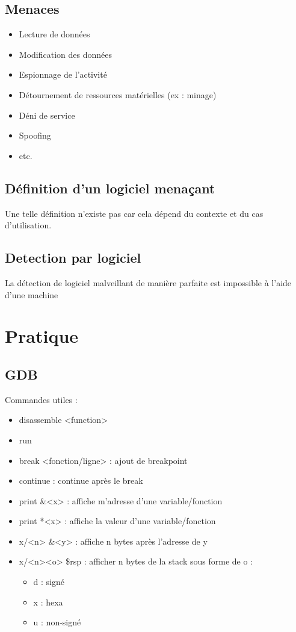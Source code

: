 \documentclass[a4paper]{article}
\begin{document}
\subsection{Menaces}
\begin{itemize}[label = \textbullet, font = \Large]
    \item Lecture de données
    \item Modification des données
    \item Espionnage de l'activité
    \item Détournement de ressources matérielles (ex : minage)
    \item Déni de service
    \item Spoofing
    \item etc.
\end{itemize}

\subsection{Définition d'un logiciel menaçant}
Une telle définition n'existe pas car cela dépend du contexte et du cas d'utilisation.

\subsection{Detection par logiciel}
La détection de logiciel malveillant de manière parfaite est impossible à l'aide d'une machine

\newpage
\section{Pratique}
\subsection{GDB}
Commandes utiles :
\begin{itemize}[label = \textbullet, font = \Large]
    \item disassemble <function>
    \item run
    \item break <fonction/ligne> : ajout de breakpoint
    \item continue : continue après le break
    \item print \&<x> : affiche m'adresse d'une variable/fonction
    \item print *<x> : affiche la valeur d'une variable/fonction
    \item x/<n> \&<y> : affiche n bytes après l'adresse de y
    \item x/<n><o> \$rsp : afficher n bytes de la stack sous forme de o :
    \begin{itemize}
        \item d : signé
        \item x : hexa
        \item u : non-signé
    \end{itemize}
\end{itemize}
\end{document}
